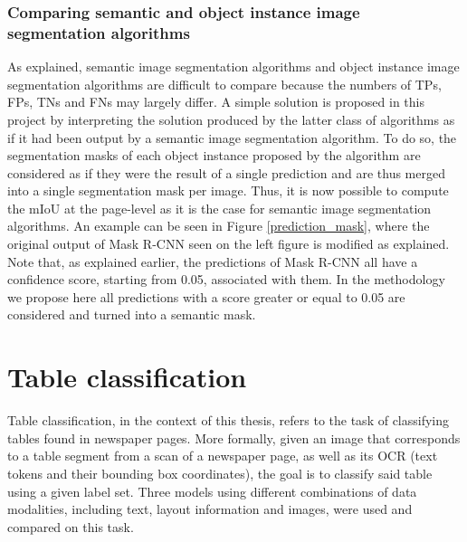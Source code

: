 \subsubsection{Comparing semantic and object instance image segmentation algorithms}
As explained, semantic image segmentation algorithms and object instance image segmentation algorithms are difficult to compare because the numbers of TPs, FPs, TNs and FNs may largely differ. A simple solution is proposed in this project by interpreting the solution produced by the latter class of algorithms as if it had been output by a semantic image segmentation algorithm. To do so, the segmentation masks of each object instance proposed by the algorithm are considered as if they were the result of a single prediction and are thus merged into a single segmentation mask per image. Thus, it is now possible to compute the mIoU at the page-level as it is the case for semantic image segmentation algorithms. An example can be seen in Figure \ref{prediction_mask}, where the original output of Mask R-CNN seen on the left figure is modified as explained. Note that, as explained earlier, the predictions of Mask R-CNN all have a confidence score, starting from 0.05, associated with them. In the methodology we propose here all predictions with a score greater or equal to 0.05 are considered and turned into a semantic mask.

\section{Table classification}
\label{table_classification}
Table classification, in the context of this thesis, refers to the task of classifying tables found in newspaper pages. More formally, given an image that corresponds to a table segment from a scan of a newspaper page, as well as its OCR (text tokens and their bounding box coordinates), the goal is to classify said table using a given label set. Three models using different combinations of data modalities, including text, layout information and images, were used and compared on this task.

